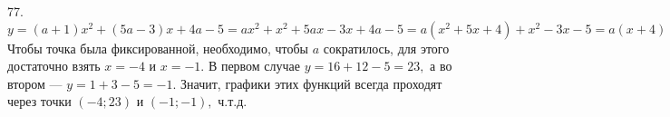 77. $y=(a+1)x^2+(5a-3)x+4a-5=ax^2+x^2+5ax-3x+4a-5=a(x^2+5x+4)+x^2-3x-5=a(x+4)(x+1)+x^2-3x-5.$ Чтобы точка была фиксированной, необходимо, чтобы $a$ сократилось, для этого достаточно взять $x=-4$ и $x=-1.$ В первом случае $y=16+12-5=23,$ а во втором --- $y=1+3-5=-1.$ Значит, графики этих функций всегда проходят через точки $(-4;23)$ и $(-1;-1),$ ч.т.д.\\
